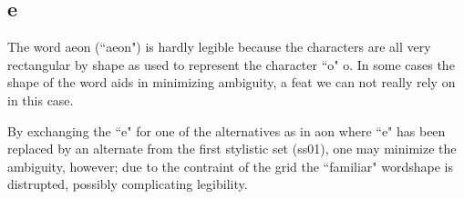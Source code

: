 \subsection{e}
The word {\ssdefault aeon} (``aeon") is hardly legible because the characters
are all very rectangular by shape as used to represent the character ``o"
{\ssdefault o}. In some cases the shape of the word aids in minimizing
ambiguity, a feat we can not really rely on in this case.

By exchanging the ``e" for one of the alternatives as in
{\ssdefault aon} where ``e" has been replaced by an alternate from the
first stylistic set (ss01), one may minimize the ambiguity, however; due to the
contraint of the grid the ``familiar" wordshape is distrupted, possibly
complicating legibility.

